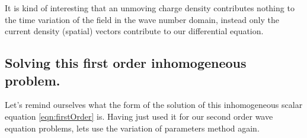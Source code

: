 \documentclass{article}
\begin{document}
It is kind of interesting that an unmoving charge density contributes nothing
to the time variation of the field in the wave number domain, instead
only the current density (spatial) vectors contribute to our differential
equation.

\subsection{ Solving this first order inhomogeneous problem. } 

Let's remind ourselves what the form of the solution of this inhomogeneous scalar equation 
\ref{eqn:firstOrder} is.  Having just used it for our second order 
wave equation problems, lets use the variation of parameters method again.



\end{document}
